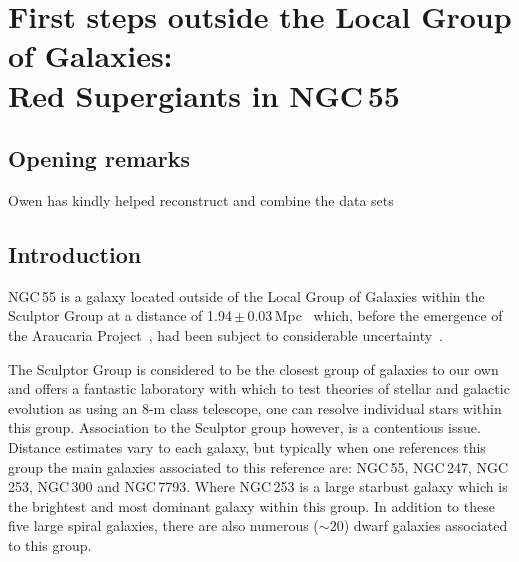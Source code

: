 \chapter{First steps outside the Local Group of Galaxies:\\
Red Supergiants in NGC\,55}\label{ch:ngc55}





\section{Opening remarks} %
\label{sec:opening_remarks}

Owen has kindly helped reconstruct and combine the data sets


\section{Introduction} %
\label{sec:introduction}

NGC\,55 is a galaxy located outside of the Local Group of Galaxies within the Sculptor Group at a distance of 1.94\,$\pm$\,0.03\,Mpc~\citep{2006AJ....132.2556P,2008ApJ...672..266G} which, before the emergence of the Araucaria Project~\citep{2005Msngr.121...23G}, had been subject to considerable uncertainty~\citep[e.g.][]{1987ApJ...323...79P,2006A&A...455..891V}.

The Sculptor Group is considered to be the closest group of galaxies to our own and offers a fantastic laboratory with which to test theories of stellar and galactic evolution as using an 8-m class telescope, one can resolve individual stars within this group.
Association to the Sculptor group however, is a contentious issue.
Distance estimates vary to each galaxy, but typically when one references this group the main galaxies associated to this reference are: NGC\,55, NGC\,247, NGC\,253, NGC\,300 and NGC\,7793.
Where NGC\,253 is a large starbust galaxy which is the brightest and most dominant galaxy within this group.
In addition to these five large spiral galaxies, there are also numerous ($\sim$20) dwarf galaxies associated to this group.

